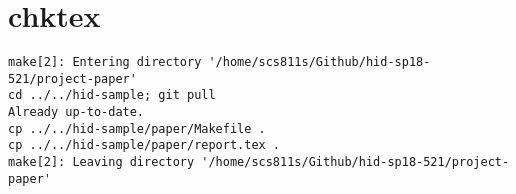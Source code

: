 \appendix
\section{chktex}
\begin{tiny}
\begin{verbatim}
make[2]: Entering directory '/home/scs811s/Github/hid-sp18-521/project-paper'
cd ../../hid-sample; git pull
Already up-to-date.
cp ../../hid-sample/paper/Makefile .
cp ../../hid-sample/paper/report.tex .
make[2]: Leaving directory '/home/scs811s/Github/hid-sp18-521/project-paper'
\end{verbatim}
\end{tiny}
